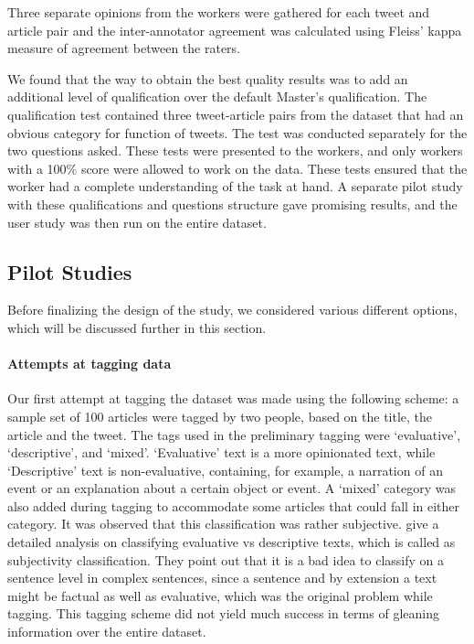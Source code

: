Three separate opinions from the workers were gathered for each tweet and article pair and the inter-annotator agreement was calculated using Fleiss' kappa measure  of agreement \citep{geertzen2012inter} between the raters. 

We found that the way to obtain the best quality results was to add an additional level of qualification over the default Master's qualification. The qualification test contained three tweet-article pairs from the dataset that had an obvious category for function of tweets. The test was conducted separately for the two questions asked. These tests were presented to the workers, and only workers with a 100\% score were allowed to work on the data. These tests ensured that the worker had a complete understanding of the task at hand. A separate pilot study with these qualifications and questions structure gave promising results, and the user study was then run on the entire dataset.

\subsection{Pilot Studies}
\label{sec:pilot}
Before finalizing the design of the study, we considered various different options, which will be discussed further in this section.

\paragraph{Attempts at tagging data} Our first attempt at tagging the dataset was made using the following scheme: a sample set of 100 articles were tagged by two people, based on the title, the article and the tweet. The tags used in the preliminary tagging were `evaluative', `descriptive', and `mixed'. `Evaluative' text is a more opinionated text, while `Descriptive' text is non-evaluative, containing, for example, a narration of an event or an explanation about a certain object or event. A `mixed' category was also added during tagging to accommodate some articles that could fall in either category. It was observed that this classification was rather subjective. \cite{liu2012survey} give a detailed analysis on classifying evaluative vs descriptive texts, which is called as subjectivity classification. They point out that it is a bad idea to classify on a sentence level in complex sentences, since a sentence and by extension a text might be factual as well as evaluative, which was the original problem while tagging. This tagging scheme did not yield much success in terms of gleaning information over the entire dataset.

